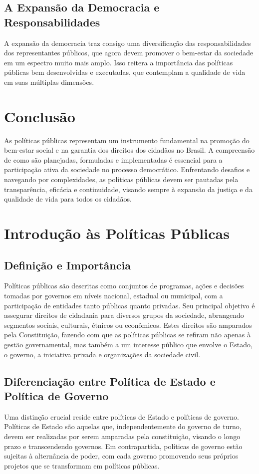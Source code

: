 \documentclass[
   article,       
   12pt,          
   oneside,       
   a4paper,       
   english,       
   brazil,        
   sumario=tradicional
   ]{abntex2}
\begin{document}
\subsection{A Expansão da Democracia e Responsabilidades}
A expansão da democracia traz consigo uma diversificação das responsabilidades dos representantes públicos, que agora devem promover o bem-estar da sociedade em um espectro muito mais amplo. Isso reitera a importância das políticas públicas bem desenvolvidas e executadas, que contemplam a qualidade de vida em suas múltiplas dimensões. 

\section{Conclusão}
As políticas públicas representam um instrumento fundamental na promoção do bem-estar social e na garantia dos direitos dos cidadãos no Brasil. A compreensão de como são planejadas, formuladas e implementadas é essencial para a participação ativa da sociedade no processo democrático. Enfrentando desafios e navegando por complexidades, as políticas públicas devem ser pautadas pela transparência, eficácia e continuidade, visando sempre à expansão da justiça e da qualidade de vida para todos os cidadãos.
\section{Introdução às Políticas Públicas}
\subsection{Definição e Importância}
Políticas públicas são descritas como conjuntos de programas, ações e decisões tomadas por governos em níveis nacional, estadual ou municipal, com a participação de entidades tanto públicas quanto privadas. Seu principal objetivo é assegurar direitos de cidadania para diversos grupos da sociedade, abrangendo segmentos sociais, culturais, étnicos ou econômicos. Estes direitos são amparados pela Constituição, fazendo com que as políticas públicas se refiram não apenas à gestão governamental, mas também a um interesse público que envolve o Estado, o governo, a iniciativa privada e organizações da sociedade civil.

\subsection{Diferenciação entre Política de Estado e Política de Governo}
Uma distinção crucial reside entre políticas de Estado e políticas de governo. Políticas de Estado são aquelas que, independentemente do governo de turno, devem ser realizadas por serem amparadas pela constituição, visando o longo prazo e transcendendo governos. Em contrapartida, políticas de governo estão sujeitas à alternância de poder, com cada governo promovendo seus próprios projetos que se transformam em políticas públicas.
\end{document}
